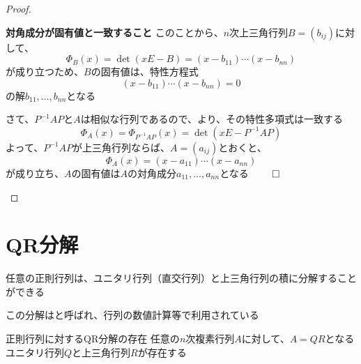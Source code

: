 \documentclass[../../../topic_linear-algebra]{subfiles}
\begin{document}
\begin{proof}
\begin{subpattern}{\bfseries 対角成分が固有値と一致すること}
    このことから、$n$次上三角行列$B = (b_{ij})$に対して、
    \begin{equation*}
      \Phi_B(x) = \det(xE - B) = (x-b_{11})\cdots (x-b_{nn})
    \end{equation*}
    が成り立つため、$B$の固有値は、特性方程式
    \begin{equation*}
      (x-b_{11})\cdots (x-b_{nn}) = 0
    \end{equation*}
    の解$b_{11},\ldots,b_{nn}$となる

    \br

    さて、$P^{-1}AP$と$A$は相似な行列であるので、より、その特性多項式は一致する
    \begin{equation*}
      \Phi_A(x) = \Phi_{P^{-1}AP}(x) = \det(xE - P^{-1}AP)
    \end{equation*}
    よって、$P^{-1}AP$が上三角行列ならば、$A = (a_{ij})$とおくと、
    \begin{equation*}
      \Phi_A(x) = (x - a_{11})\cdots (x - a_{nn})
    \end{equation*}
    が成り立ち、$A$の固有値は$A$の対角成分$a_{11},\ldots,a_{nn}$となる $\qed$
  \end{subpattern}
\end{proof}

\sectionline
\section{QR分解}

任意の正則行列は、ユニタリ行列（直交行列）と上三角行列の積に分解することができる

この分解はと呼ばれ、行列の数値計算等で利用されている

\begin{theorem*}{正則行列に対するQR分解の存在}
  任意の$n$次複素行列$A$に対して、$A=QR$となるユニタリ行列$Q$と上三角行列$R$が存在する
\end{theorem*}
\end{document}
